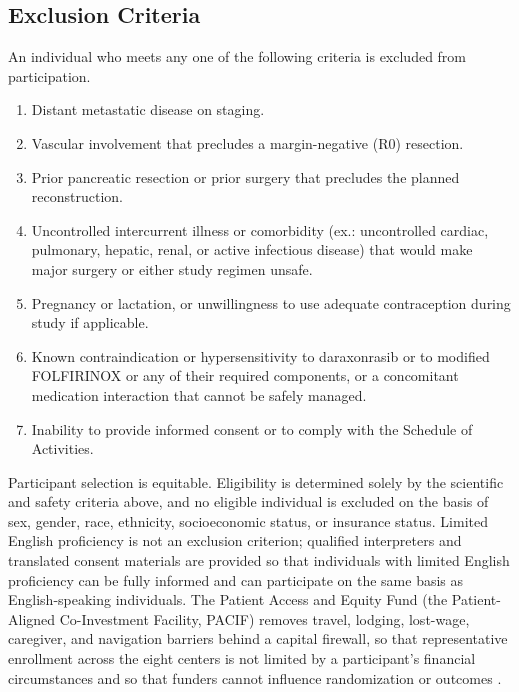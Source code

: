 \subsection{Exclusion Criteria}

An individual who meets any one of the following criteria is excluded from
participation.

\begin{enumerate}[leftmargin=1.6em,itemsep=2pt,topsep=2pt]
\item Distant metastatic disease on staging.
\item Vascular involvement that precludes a margin-negative (R0) resection.
\item Prior pancreatic resection or prior surgery that precludes the planned
reconstruction.
\item Uncontrolled intercurrent illness or comorbidity (ex.: uncontrolled
cardiac, pulmonary, hepatic, renal, or active infectious disease) that would make
major surgery or either study regimen unsafe.
\item Pregnancy or lactation, or unwillingness to use adequate contraception
during study if applicable.
\item Known contraindication or hypersensitivity to daraxonrasib or to modified
FOLFIRINOX or any of their required components, or a concomitant medication
interaction that cannot be safely managed.
\item Inability to provide informed consent or to comply with the Schedule of
Activities.
\end{enumerate}

Participant selection is equitable. Eligibility is determined solely by the
scientific and safety criteria above, and no eligible individual is excluded on the
basis of sex, gender, race, ethnicity, socioeconomic status, or insurance status.
Limited English proficiency is not an exclusion criterion; qualified interpreters
and translated consent materials are provided so that individuals with limited
English proficiency can be fully informed and can participate on the same basis as
English-speaking individuals. The Patient Access and Equity Fund (the
Patient-Aligned Co-Investment Facility, PACIF) removes travel, lodging, lost-wage,
caregiver, and navigation barriers behind a capital firewall, so that
representative enrollment across the eight centers is not limited by a
participant's financial circumstances and so that funders cannot influence
randomization or outcomes \cite{kawchak2026hr9510,ecfr2026part54}.

